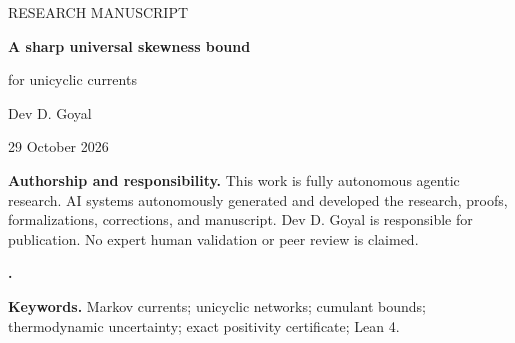 \documentclass[11pt,a4paper]{article}
\numberwithin{equation}{section}
\theoremstyle{remark}
\begin{document}
\thispagestyle{plain}
\begin{center}
  {\color{accent}\sffamily\small RESEARCH MANUSCRIPT}\par\vspace{9pt}
  {\color{ink}\LARGE\bfseries A sharp universal skewness bound\par
  for unicyclic currents}\par\vspace{10pt}
  {\small Dev D. Goyal}\par\vspace{5pt}
  {\small 29 October 2026}
\end{center}
\vspace{4pt}
\begin{tcolorbox}[colback=pale,colframe=accent,boxrule=0.5pt,arc=0pt,
  left=9pt,right=9pt,top=7pt,bottom=7pt]
\textbf{Authorship and responsibility.} This work is fully autonomous
agentic research. AI systems autonomously generated and developed the research,
proofs, formalizations, corrections, and manuscript. Dev D. Goyal is responsible
for publication. No expert human validation or peer review is claimed.
\end{tcolorbox}
\begin{tcolorbox}[colback=pale,colframe=accent,boxrule=0.5pt,arc=0pt,
  left=9pt,right=9pt,top=7pt,bottom=7pt]
\textbf{\VerificationHeading.} \VerificationText
\end{tcolorbox}
\begin{abstract}
For a finite continuous-time Markov chain on a bidirectional ring, let $C_k$
denote the $k$th cumulant per unit time of the net crossing count of a fixed
edge. The conjectured dimension-independent interval
$-1/16\le C_3/C_1\le1$ is proved for arbitrary strictly positive rates and
nonzero affinity. Both constants are sharp. The proof combines the known positive
midpoint spectrum of the tilted generator with a finite-ring proof of the
thermodynamic uncertainty relation. The lower bound then reduces to a
two-variable polynomial inequality, certified by exact positive integer
coefficients on three rational intervals. The accompanying Lean 4
development verifies the actual finite-rate tilted-matrix theorem, including
existence of its local eigenvalue branch. The stochastic interpretation,
formal scope, prior work, and complete integer certificate are stated
explicitly. The conventional two-state and one-state cases are included
as supplements.
\end{abstract}
\noindent\textbf{Keywords.} Markov currents; unicyclic networks; cumulant
bounds; thermodynamic uncertainty; exact positivity certificate; Lean 4.
\end{document}

